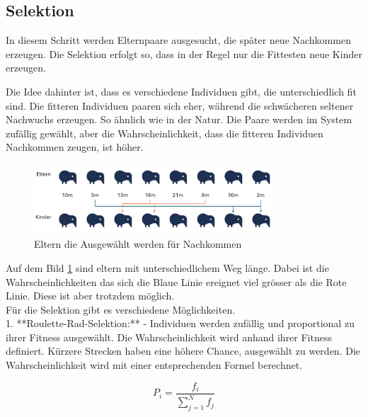 %
%
%
%
\subsection{Selektion
    \label{buch:paper:varalg:subsection:selection}}
In diesem Schritt werden Elternpaare ausgesucht, die später 
neue Nachkommen erzeugen. Die Selektion erfolgt so, dass in der 
Regel nur die Fittesten neue Kinder erzeugen.

Die Idee dahinter ist, dass es verschiedene Individuen gibt, 
die unterschiedlich fit sind. Die fitteren Individuen paaren 
sich eher, während die schwächeren seltener Nachwuchs erzeugen. 
So ähnlich wie in der Natur. Die Paare werden im System zufällig 
gewählt, aber die Wahrscheinlichkeit, dass die fitteren 
Individuen Nachkommen zeugen, ist höher.

\begin{figure}
    \centering
    \includegraphics[width=0.8\textwidth]{
        papers/varalg/images/teil3/04OffspringProbability.png
    }
    \caption{Eltern die Ausgewählt werden für Nachkommen}
    \label{fig:selection_of_parents}
\end{figure}

Auf dem Bild \ref{fig:selection_of_parents} sind eltern mit unterschiedlichem
Weg länge. Dabei ist die Wahrscheinlichkeiten das sich die Blaue Linie ereignet 
viel grösser als die Rote Linie. Diese ist aber trotzdem möglich.
\\
Für die Selektion gibt es verschiedene Möglichkeiten.
\\
1. **Roulette-Rad-Selektion:** 
- Individuen werden zufällig und proportional zu ihrer 
Fitness ausgewählt. Die Wahrscheinlichkeit wird anhand ihrer 
Fitness definiert. Kürzere Strecken haben eine höhere Chance, 
ausgewählt zu werden. Die Wahrscheinlichkeit wird mit einer 
entsprechenden Formel berechnet.

\begin{equation}
    \label{eq:probability_fittest}
    P_i = \frac{f_i}{\sum_{j=1}^{N} f_j}
\end{equation}

